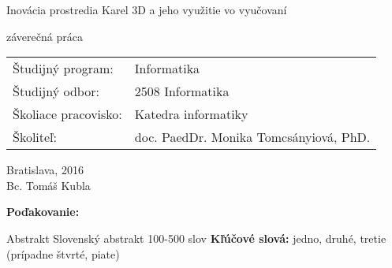 \documentclass[12pt, oneside]{book}
\def\mfyear{2016}
\def\mftitle{Inovácia prostredia Karel 3D a jeho využitie vo vyučovaní}
\def\mfthesistype{záverečná práca}
\def\mfauthor{Bc. Tomáš Kubla}
\def\mfadvisor{doc. PaedDr. Monika Tomcsányiová, PhD.}
\def\mfplacedate{Bratislava, \mfyear}
\def\odbor{2508 Informatika} %
\def\program{ Informatika }
\def\stredisko{ Katedra informatiky }
\begin{document}
\begin{minipage}{1.1\textwidth}
\begin{flushright}
\bigskip\bigskip
\begin{center}
\sc\LARGE\mftitle
\end{center}
\centerline{\sc\mfthesistype}
\end{flushright}

\bigskip
\vspace{3cm}
\bigskip
\begin{tabular}{ll}  
Študijný program: & \program \\
Študijný odbor: & \odbor \\
Školiace pracovisko: & \stredisko \\
Školiteľ: & \mfadvisor \\
\end{tabular}
\end{minipage}
\vfill

\noindent \mfplacedate\\
\indent\mfauthor

\eject %





\newpage 
\thispagestyle{empty}

\frontmatter

\newpage 
\thispagestyle{empty}

\vfill
{\bf Poďakovanie:}



\newpage 
\thispagestyle{empty}

\huge{Abstrakt}
\normalsize
\newline
Slovenský abstrakt 100-500 slov
{\bf Kľúčové slová:} jedno, druhé, tretie (prípadne štvrté, piate)
\end{document}
